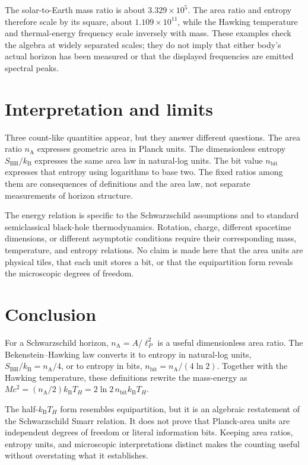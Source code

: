 \documentclass[12pt]{article}
\begin{document}
The solar-to-Earth mass ratio is about $3.329\times10^5$. The area ratio and entropy therefore scale by its square, about $1.109\times10^{11}$, while the Hawking temperature and thermal-energy frequency scale inversely with mass. These examples check the algebra at widely separated scales; they do not imply that either body's actual horizon has been measured or that the displayed frequencies are emitted spectral peaks.

\section{Interpretation and limits}

Three count-like quantities appear, but they answer different questions. The area ratio $n_{\mathrm A}$ expresses geometric area in Planck units. The dimensionless entropy $S_{\mathrm{BH}}/k_{\mathrm B}$ expresses the same area law in natural-log units. The bit value $n_{\mathrm{bit}}$ expresses that entropy using logarithms to base two. The fixed ratios among them are consequences of definitions and the area law, not separate measurements of horizon structure.

The energy relation is specific to the Schwarzschild assumptions and to standard semiclassical black-hole thermodynamics. Rotation, charge, different spacetime dimensions, or different asymptotic conditions require their corresponding mass, temperature, and entropy relations. No claim is made here that the area units are physical tiles, that each unit stores a bit, or that the equipartition form reveals the microscopic degrees of freedom.

\section{Conclusion}

For a Schwarzschild horizon, $n_{\mathrm A}=A/\ell_P^2$ is a useful dimensionless area ratio. The Bekenstein--Hawking law converts it to entropy in natural-log units, $S_{\mathrm{BH}}/k_{\mathrm B}=n_{\mathrm A}/4$, or to entropy in bits, $n_{\mathrm{bit}}=n_{\mathrm A}/(4\ln2)$. Together with the Hawking temperature, these definitions rewrite the mass-energy as $Mc^2=(n_{\mathrm A}/2)k_{\mathrm B}T_H=2\ln2\,n_{\mathrm{bit}}k_{\mathrm B}T_H$.

The half-$k_{\mathrm B}T_H$ form resembles equipartition, but it is an algebraic restatement of the Schwarzschild Smarr relation. It does not prove that Planck-area units are independent degrees of freedom or literal information bits. Keeping area ratios, entropy units, and microscopic interpretations distinct makes the counting useful without overstating what it establishes.
\end{document}
